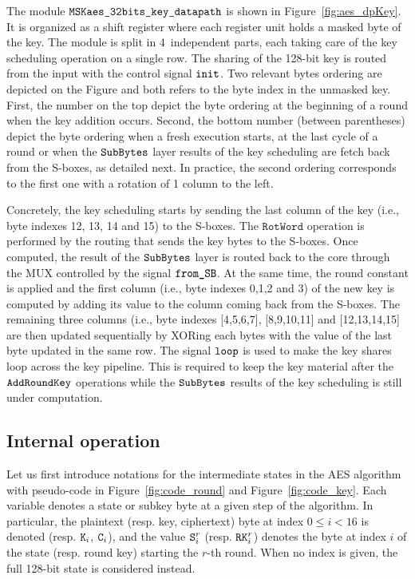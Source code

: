 \documentclass{scrartcl}
\begin{document}
The module $\texttt{MSKaes\_32bits\_key\_datapath}$ is shown in Figure~\ref{fig:aes_dpKey}. It is
organized as a shift register where each register unit holds a masked byte of
the key. The module is split in 4~independent parts, each taking care of the
key scheduling operation on a single row. The sharing of the 128-bit key is
routed from the input with the control signal $\texttt{init}$. Two relevant
bytes ordering are depicted on the Figure and both refers to the byte index in
the unmasked key. First, the number on the top depict the byte ordering at the
beginning of a round when the key addition occurs. Second, the bottom number
(between parentheses) depict the byte ordering when a fresh execution starts,
at the last cycle of a round or when the $\texttt{SubBytes}$ layer results of the key
scheduling are fetch back from the S-boxes, as detailed next. In practice, the
second ordering corresponds to the first one with a rotation of 1 column to the
left.

Concretely, the key scheduling starts by sending the last column of the key
(i.e., byte indexes 12, 13, 14 and 15) to the S-boxes.  The $\texttt{RotWord}$
operation is performed by the routing that sends the key bytes to the S-boxes.
Once computed, the result of the $\texttt{SubBytes}$ layer is routed back to the core through
the MUX controlled by the signal $\texttt{from\_SB}$.  At the same time,
the round constant is applied and the first column (i.e., byte indexes 0,1,2
and 3) of the new key is computed by adding its value to the column coming back
from the S-boxes.  The remaining three columns (i.e., byte indexes [4,5,6,7],
[8,9,10,11] and [12,13,14,15] are then updated sequentially by XORing each
bytes with the value of the last byte updated in the same row. The signal
$\texttt{loop}$ is used to make the key shares loop across the key pipeline.
This is required to keep the key material after the $\texttt{AddRoundKey}$ operations while the
$\texttt{SubBytes}$ results of the key scheduling is still under computation. 

\subsection{Internal operation}

Let us first introduce notations for the intermediate states in the AES algorithm with
pseudo-code in Figure~\ref{fig:code_round} and Figure~\ref{fig:code_key}.
Each variable denotes a state or subkey byte at a given step of the algorithm.
In particular, the plaintext (resp. key, ciphertext) byte at index $0\leq i<16$
is denoted  (resp. $\texttt{K}_{i}$, $\texttt{C}_{i}$), and the value $\texttt{S}_{i}^{r}$ (resp.
$\texttt{RK}_{i}^{r}$) denotes the byte at index $i$ of the state (resp. round key)
starting the $r$-th round.
When no index is given, the full 128-bit state is considered instead.
\end{document}
